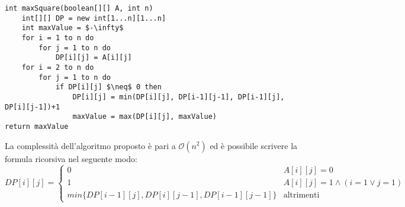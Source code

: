 \documentclass[../cheatSheetAlgoritmi.tex]{subfiles}
\begin{document}
\begin{lstlisting}[caption=Quadrato Binario]
int maxSquare(boolean[][] A, int n)
	int[][] DP = new int[1...n][1...n]
	int maxValue = $-\infty$
	for i = 1 to n do
		for j = 1 to n do
			DP[i][j] = A[i][j]
	for i = 2 to n do
		for j = 1 to n do
			if DP[i][j] $\neq$ 0 then
				DP[i][j] = min(DP[i][j], DP[i-1][j-1], DP[i-1][j], DP[i][j-1])+1
				maxValue = max(DP[i][j], maxValue)
return maxValue
\end{lstlisting}
La complessità dell'algoritmo proposto è pari a $\mathcal{O}(n^{2})$ ed è possibile scrivere la formula ricorsiva nel seguente modo:
\begin{equation*}
    DP[i][j]=\begin{cases}
        0 & \text{$A[i][j] = 0$}\\
        1 & \text{$A[i][j] = 1 \land (i = 1 \lor j = 1)$} \\
        min\{DP[i-1][j], DP[i][j-1], DP[i-1][j-1]\} & \text{altrimenti}
    \end{cases}
\end{equation*}
\newpage
\end{document}
